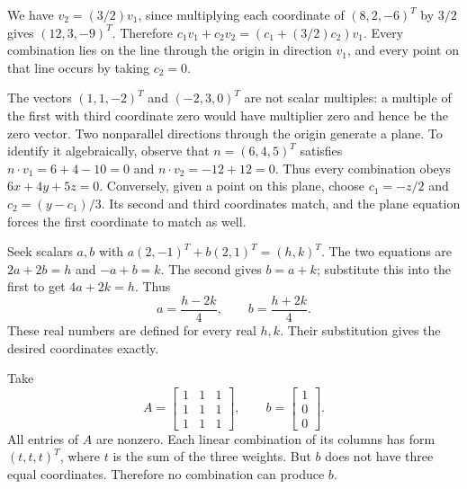We have $v_2=(3/2)v_1$, since multiplying each coordinate of
$(8,2,-6)^T$ by $3/2$ gives $(12,3,-9)^T$. Therefore
$c_1v_1+c_2v_2=(c_1+(3/2)c_2)v_1$. Every combination lies on the
line through the origin in direction $v_1$, and every point on that
line occurs by taking $c_2=0$.

The vectors $(1,1,-2)^T$ and $(-2,3,0)^T$ are not scalar multiples:
a multiple of the first with third coordinate zero would have multiplier
zero and hence be the zero vector. Two nonparallel directions through
the origin generate a plane. To identify it algebraically, observe that
$n=(6,4,5)^T$ satisfies $n\cdot v_1=6+4-10=0$ and
$n\cdot v_2=-12+12=0$. Thus every combination obeys
$6x+4y+5z=0$.
Conversely, given a point on this plane, choose $c_1=-z/2$ and
$c_2=(y-c_1)/3$. Its second and third coordinates match, and the
plane equation forces the first coordinate to match as well.

Seek scalars $a,b$ with $a(2,-1)^T+b(2,1)^T=(h,k)^T$.
The two equations are $2a+2b=h$ and $-a+b=k$.
The second gives $b=a+k$; substitute this into the first to get
$4a+2k=h$. Thus
\[
a=\frac{h-2k}{4},\qquad b=\frac{h+2k}{4}.
\]
These real numbers are defined for every real $h,k$. Their substitution
gives the desired coordinates exactly.

Take
\[
A=\begin{bmatrix}1&1&1\\1&1&1\\1&1&1\end{bmatrix},\qquad
b=\begin{bmatrix}1\\0\\0\end{bmatrix}.
\]
All entries of $A$ are nonzero. Each linear combination of its columns
has form $(t,t,t)^T$, where $t$ is the sum of the three weights.
But $b$ does not have three equal coordinates. Therefore no combination
can produce $b$.

